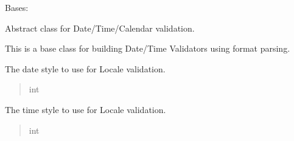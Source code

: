 \documentclass[letterpaper,10pt,english]{sphinxmanual}
\begin{document}
\begin{fulllineitems}
\label{\detokenize{apache_commons_validator_python.routines:apache_commons_validator_python.routines.abstract_calendar_validator.AbstractCalendarValidator}}
\pysigstartsignatures
{}
\pysigstopsignatures
\sphinxAtStartPar
Bases: 

\sphinxAtStartPar
Abstract class for Date/Time/Calendar validation.

\sphinxAtStartPar
This is a base class for building Date/Time Validators using format parsing.

\begin{fulllineitems}
\label{\detokenize{apache_commons_validator_python.routines:apache_commons_validator_python.routines.abstract_calendar_validator.AbstractCalendarValidator.date_style}}
\pysigstartsignatures
{}
\pysigstopsignatures
\sphinxAtStartPar
The date style to use for Locale validation.
\begin{quote}\begin{description}
\sphinxAtStartPar
int

\end{description}\end{quote}

\end{fulllineitems}


\begin{fulllineitems}
\label{\detokenize{apache_commons_validator_python.routines:apache_commons_validator_python.routines.abstract_calendar_validator.AbstractCalendarValidator.time_style}}
\pysigstartsignatures
{}
\pysigstopsignatures
\sphinxAtStartPar
The time style to use for Locale validation.
\begin{quote}\begin{description}
\sphinxAtStartPar
int


\end{description}
\end{quote}
\end{fulllineitems}
\end{fulllineitems}
\end{document}
